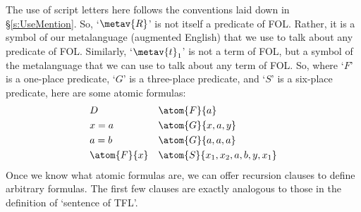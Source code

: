 The use of script letters here follows the conventions laid down in \S\ref{s:UseMention}. So, `$\metav{R}$' is not itself a predicate of FOL. Rather, it is a symbol of our metalanguage (augmented English) that we use to talk about any predicate of FOL. Similarly, `$\metav{t}_1$' is not a term of FOL, but a symbol of the metalanguage that we can use to talk about any term of FOL. So, where `$F$' is a one-place predicate, `$G$' is a three-place predicate, and `$S$' is a six-place predicate, here are some atomic formulas:
	\begin{align*}
		& D &&  \atom{F}{a}\\
		& x = a && \atom{G}{x,a,y}\\
		& a = b && \atom{G}{a,a,a}\\
		& \atom{F}{x} && \atom{S}{x_1, x_2, a, b, y, x_1}\\
	\end{align*}
Once we know what atomic formulas are, we can offer recursion clauses to define arbitrary formulas. The first few clauses are exactly analogous to those in the definition of `sentence of TFL'.
